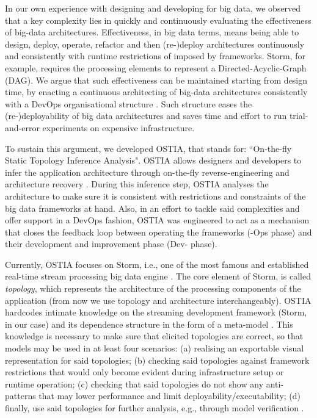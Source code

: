 In our own experience with designing and developing for big data, we observed that a key complexity lies in quickly and continuously evaluating the effectiveness of big-data architectures. Effectiveness, in big data terms, means being able to design, deploy, operate, refactor and then (re-)deploy architectures continuously and consistently with runtime restrictions of imposed by frameworks. Storm, for example, requires the processing elements to represent a Directed-Acyclic-Graph (DAG).
We argue that such effectiveness can be maintained starting from design time, by enacting a continuous architecting of big-data architectures consistently with a DevOps organisational structure \cite{ossslr,devops}. Such structure eases the (re-)deployability of big data architectures and saves time and effort to run trial-and-error experiments on expensive infrastructure.

To sustain this argument, we developed OSTIA, that stands for: ``On-the-fly Static Topology Inference Analysis". OSTIA allows designers and developers to infer the application architecture through on-the-fly reverse-engineering and architecture recovery \cite{archrec}. During this inference step, OSTIA analyses the architecture to make sure it is consistent with restrictions and constraints of the big data frameworks at hand. Also, in an effort to tackle said complexities and offer support in a DevOps fashion, OSTIA was engineered to act as a mechanism that closes the feedback loop between operating the frameworks (-Ops phase) and their development and improvement phase (Dev- phase).

Currently, OSTIA focuses on Storm, i.e., one of the most famous and established real-time stream processing big data engine \cite{storm, toshniwal2014storm}. The core element of Storm, is called \emph{topology}, which represents the architecture of the processing components of the application (from now we use topology and architecture interchangeably). OSTIA hardcodes intimate knowledge on the streaming development framework (Storm, in our case) and its dependence structure in the form of a meta-model \cite{mda}. This knowledge is necessary to make sure that elicited topologies are correct, so that models may be used in at least four scenarios: (a) realising an exportable visual representation for said topologies; (b) checking said topologies against framework restrictions that would only become evident during infrastructure setup or runtime operation; (c) checking that said topologies do not show any anti-patterns \cite{patternoriented2000} that may lower performance and limit deployability/executability; (d) finally, use said topologies for further analysis, e.g., through model verification \cite{icsoft}.

